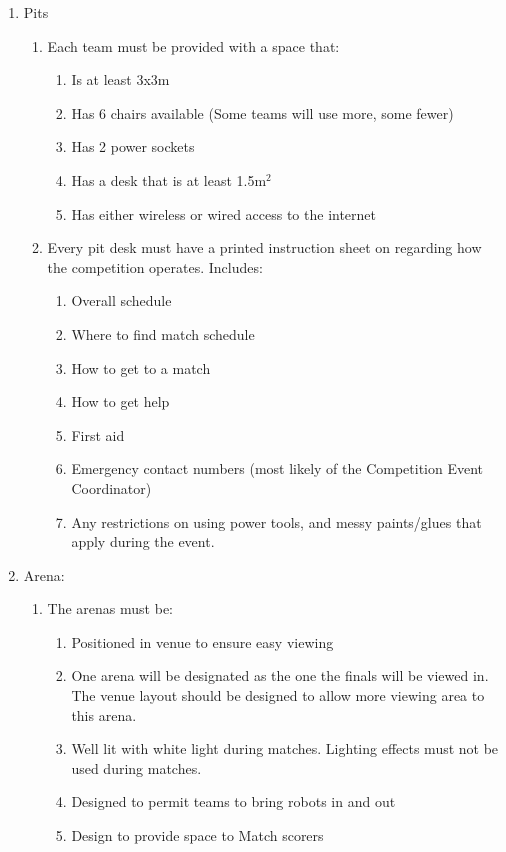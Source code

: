 \begin{enumerate}
\begin{enumerate}
  \item Pits
    \begin{enumerate}
    \item Each team must be provided with a space that:
      \begin{enumerate}
      \item Is at least 3x3m
      \item Has 6 chairs available (Some teams will use more, some fewer)
      \item Has 2 power sockets
      \item Has a desk that is at least 1.5m$^2$
      \item Has either wireless or wired access to the internet
      \end{enumerate}

    \item Every pit desk must have a printed instruction sheet on regarding how the competition operates.  Includes:
      \begin{enumerate}
      \item Overall schedule
      \item Where to find match schedule
      \item How to get to a match
      \item How to get help
      \item First aid
      \item Emergency contact numbers (most likely of the Competition Event Coordinator)
      \item Any restrictions on using power tools, and messy paints/glues that apply during the event.
      \end{enumerate}
    \end{enumerate}

  \item Arena:
    \begin{enumerate}
    \item The arenas must be:
      \begin{enumerate}
      \item Positioned in venue to ensure easy viewing
      \item One arena will be designated as the one the finals will be viewed in.  The venue layout should be designed to allow more viewing area to this arena.

      \item Well lit with white light during matches.  Lighting effects must not be used during matches.
      \item Designed to permit teams to bring robots in and out
      \item Design to provide space to Match scorers
      \end{enumerate}
    \end{enumerate}


\end{enumerate}
\end{enumerate}
